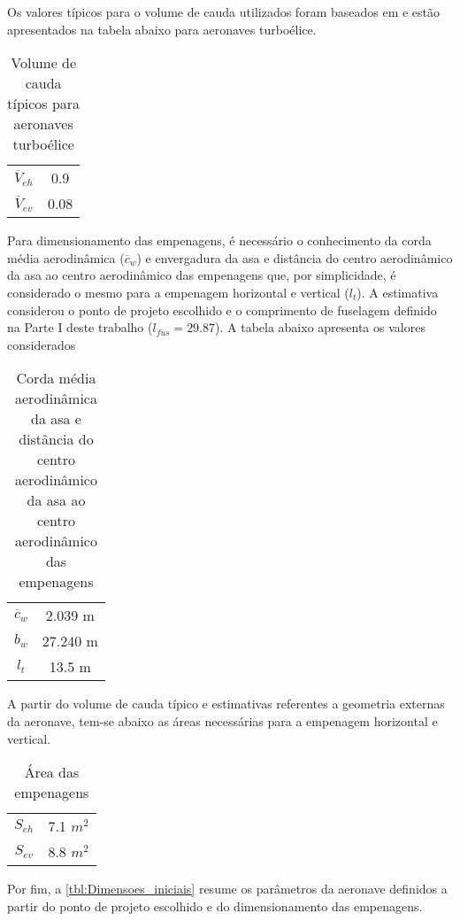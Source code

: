 Os valores típicos para o volume de cauda utilizados foram baseados em \cite{raymer2012aircraft} e estão apresentados na tabela abaixo para aeronaves turboélice.

\begin{table}[H]
\centering
\caption{Volume de cauda típicos para aeronaves turboélice}
\label{tbl:vbar}
\begin{tabular}{cc}
\toprule
$\overline{V}_{eh}$ & 0.9  \\
$\overline{V}_{ev}$  & 0.08  \\
\bottomrule
\end{tabular}
\end{table}

Para dimensionamento das empenagens, é necessário o conhecimento da corda média aerodinâmica ($\overline{c}_w$) e envergadura da asa e distância do centro aerodinâmico da asa ao centro aerodinâmico das empenagens que, por simplicidade, é considerado o mesmo para a empenagem horizontal e vertical ($l_t$). A estimativa considerou o ponto de projeto escolhido e o comprimento de fuselagem definido na Parte I deste trabalho ($l_{fus} = 29.87$). A tabela abaixo apresenta os valores considerados

\begin{table}[H]
\centering
\caption{Corda média aerodinâmica da asa e distância do centro aerodinâmico da asa ao centro aerodinâmico das empenagens}
\label{tbl:lt}
\begin{tabular}{cc}
\toprule
$\overline{c}_w$ & 2.039 m \\
$b_w$  & 27.240 m \\
$l_t$  & 13.5 m \\
\bottomrule
\end{tabular}
\end{table}

A partir do volume de cauda típico e estimativas referentes a geometria externas da aeronave, tem-se abaixo as áreas necessárias para a empenagem horizontal e vertical.

\begin{table}[H]
\centering
\caption[Área das Empenagens]{Área das empenagens}
\label{tbl:s_eh}
\begin{tabular}{cc}
\toprule
$S_{eh}$ & 7.1 $m^2$ \\
$S_{ev}$  & 8.8 $m^2$ \\
\bottomrule
\end{tabular}
\end{table}

Por fim, a \autoref{tbl:Dimensoes_iniciais} resume os parâmetros da aeronave definidos a partir do ponto de projeto escolhido e do dimensionamento das empenagens.


